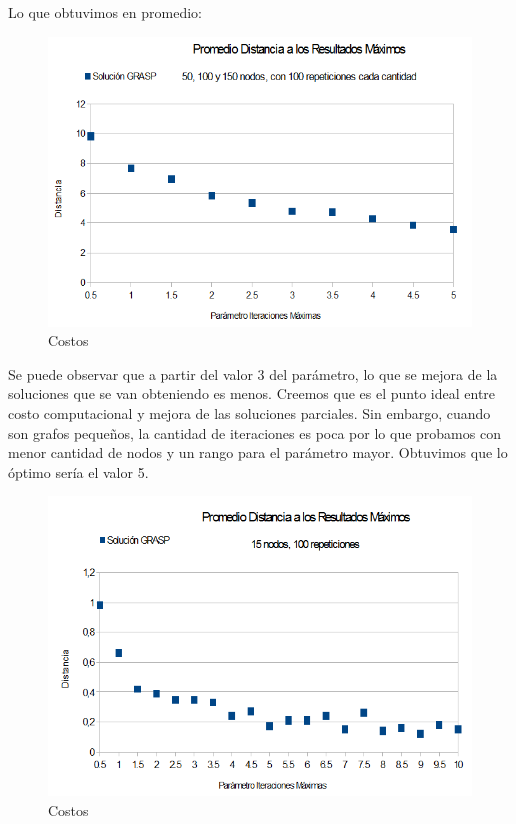 \begin{itemize}
\quad Lo que obtuvimos en promedio:

\begin{figure}[H]
	\centering
	\includegraphics[scale=0.6]{optimizacionGRASPParIterMax.png}
\caption{Costos}
\end{figure}

\quad Se puede observar que a partir del valor 3 del parámetro, lo que se mejora de la soluciones que se van obteniendo es menos. Creemos que es el punto ideal entre costo computacional y mejora de las soluciones parciales. Sin embargo, cuando son grafos pequeños, la cantidad de iteraciones es poca por lo que probamos con menor cantidad de nodos y un rango para el parámetro mayor. Obtuvimos que lo óptimo sería el valor 5.

\begin{figure}[H]
	\centering
	\includegraphics[scale=0.6]{optimizacionGRASPParIterMax2.png}
\caption{Costos}
\end{figure}


\end{itemize}
